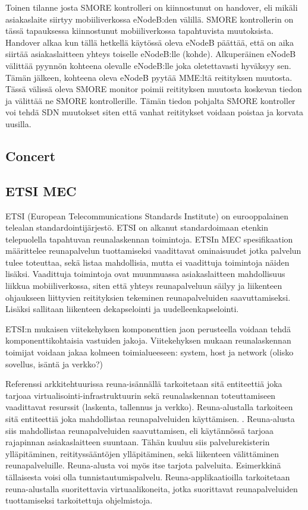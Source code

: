 \documentclass[finnish]{tktltiki2}
\theoremstyle{definition}
\theoremstyle{remark}
\begin{document}
Toinen tilanne josta SMORE kontrolleri on kiinnostunut on handover, eli mikäli asiakaslaite siirtyy mobiiliverkossa eNodeB:den välillä. SMORE kontrollerin on tässä tapauksessa kiinnostunut mobiiliverkossa tapahtuvista muutoksista. 
Handover alkaa kun tällä hetkellä käytössä oleva eNodeB päättää, että on aika siirtää asiakaslaitteen yhteys toiselle eNodeB:lle (kohde).
Alkuperäinen eNodeB välittää pyynnön kohteena olevalle eNodeB:lle joka oletettavasti hyväksyy sen. Tämän jälkeen, kohteena oleva eNodeB pyytää MME:ltä reitityksen muutosta. Tässä välissä oleva SMORE monitor poimii reitityksen muutosta koskevan tiedon ja välittää ne SMORE kontrollerille.
Tämän tiedon pohjalta SMORE kontroller voi tehdä SDN muutokset siten että vanhat reititykset voidaan poistaa ja korvata uusilla.

\subsection{Concert}
\subsection{ETSI MEC}
ETSI (European Telecommunications Standards Institute) on eurooppalainen telealan standardointijärjestö.
ETSI on alkanut standardoimaan etenkin telepuolella tapahtuvan reunalaskennan toimintoja. 
ETSIn MEC spesifikaation määrittelee reunapalvelun tuottamiseksi vaadittavat ominaisuudet jotka palvelun tulee toteuttaa, sekä listaa mahdollisia, mutta ei vaadittuja toimintoja näiden lisäksi. 
Vaadittuja toimintoja ovat muunmuassa asiakaslaitteen mahdollisuus liikkua mobiiliverkossa, siten että yhteys reunapalveluun säilyy ja liikenteen ohjaukseen liittyvien reitityksien tekeminen reunapalveluiden saavuttamiseksi. Lisäksi sallitaan liikenteen dekapselointi ja uudelleenkapselointi. \cite{etsitechreq}

ETSI:n mukaisen viitekehyksen \cite{etsirefarch} komponenttien jaon perusteella voidaan tehdä
komponenttikohtaisia vastuiden jakoja. Viitekehyksen mukaan reunalaskennan toimijat voidaan jakaa kolmeen toimialueeseen: system, host ja network (olisko sovellus, isäntä ja verkko?)

Referenssi arkkitehtuurissa reuna-isännällä tarkoitetaan sitä entiteettiä joka tarjoaa virtualisointi-infrastruktuurin sekä reunalaskennan toteuttamiseen vaadittavat resurssit (laskenta, tallennus ja verkko).
Reuna-alustalla tarkoiteen sitä entiteettiä joka mahdollistaa reunapalveluiden käyttämisen. . Reuna-alusta siis mahdollistaa reunapalveluiden saavuttamisen, eli käytännössä tarjoaa rajapinnan asiakaslaitteen suuntaan. Tähän kuuluu siis palvelurekisterin ylläpitäminen, reitityssääntöjen ylläpitäminen, sekä liikenteen välittäminen reunapalveluille. Reuna-alusta voi myös itse tarjota  palveluita.
Esimerkkinä tällaisesta voisi olla tunnistautumispalvelu. 
Reuna-applikaatioilla tarkoitetaan reuna-alustalla suoritettavia virtuaalikoneita, jotka suorittavat reunapalveluiden tuottamiseksi tarkoitettuja ohjelmistoja.
\end{document}
